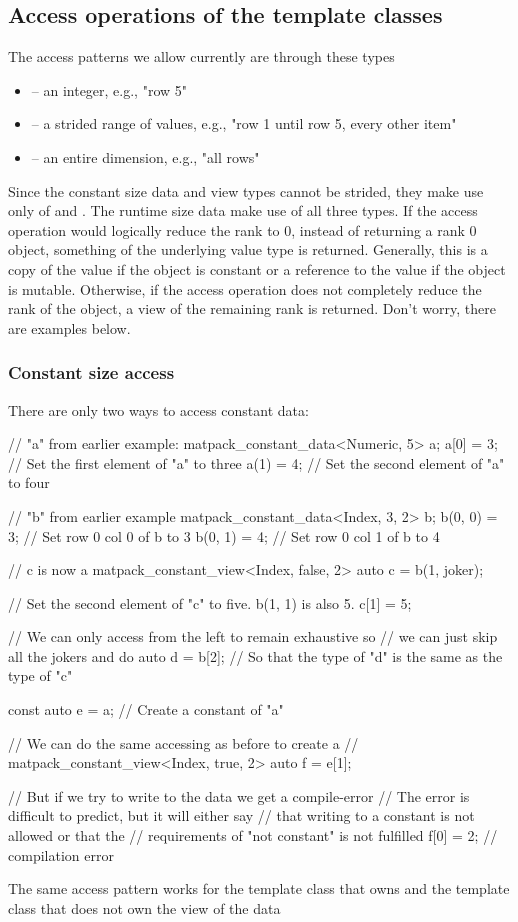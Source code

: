 \subsection{Access operations of the template classes}
The access patterns we allow currently are through these types
\begin{itemize}
\item {} -- an integer, e.g., "row 5"
\item {} -- a strided range of values, e.g., "row 1 until row 5, every other item"
\item {} -- an entire dimension, e.g., "all rows"
\end{itemize}
Since the constant size data and view types cannot be strided, they make use only of  and .
The runtime size data make use of all three types.
If the access operation would logically reduce the rank to 0, instead of returning a rank 0 object,
something of the underlying value type  is returned.  Generally, this is a copy of the value if the
object is constant or a reference to the value if the object is mutable.
Otherwise, if the access operation does not completely reduce the rank of the object, a view of the remaining rank is returned.
Don't worry, there are examples below.

\subsubsection{Constant size access}
There are only two ways to access constant data:
\begin{code}
// "a" from earlier example:
matpack_constant_data<Numeric, 5> a;
a[0] = 3;  // Set the first element of "a" to three
a(1) = 4;  // Set the second element of "a" to four

// "b" from earlier example
matpack_constant_data<Index, 3, 2> b;
b(0, 0) = 3;  // Set row 0 col 0 of b to 3
b(0, 1) = 4;  // Set row 0 col 1 of b to 4

// c is now a matpack_constant_view<Index, false, 2>
auto c = b(1, joker);

// Set the second element of "c" to five. b(1, 1) is also 5.
c[1] = 5;

// We can only access from the left to remain exhaustive so
// we can just skip all the jokers and do
auto d = b[2];
// So that the type of "d" is the same as the type of "c"

const auto e = a;  // Create a constant of "a"

// We can do the same accessing as before to create a
// matpack_constant_view<Index, true, 2>
auto f = e[1];

// But if we try to write to the data we get a compile-error
// The error is difficult to predict, but it will either say
// that writing to a constant is not allowed or that the
// requirements of "not constant" is not fulfilled
f[0] = 2;  // compilation error
\end{code}
The same access pattern works for the template class that owns and 
the template class that does not own the view of the data

